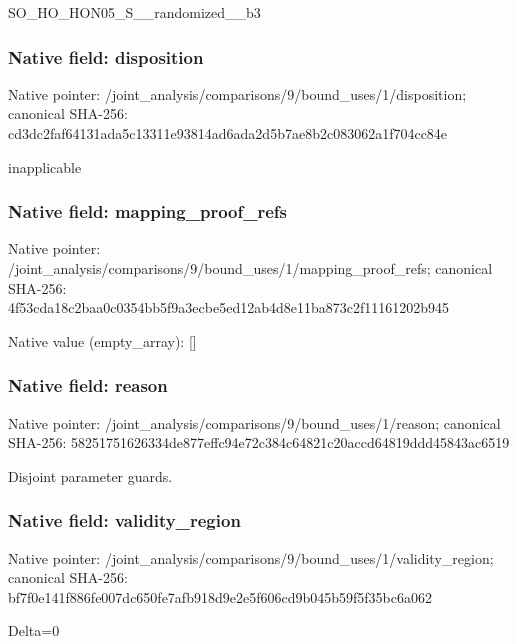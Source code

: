 \documentclass[10pt,a4paper]{article}
\begin{document}
\begingroup\raggedright\sloppy SO\_\allowbreak{}HO\_\allowbreak{}HON05\_\allowbreak{}S\_\allowbreak{}\_\allowbreak{}randomized\_\allowbreak{}\_\allowbreak{}b3\par\endgroup

\subsubsection{Native field: disposition}
Native pointer: /joint\_\allowbreak{}analysis/comparisons/9/bound\_\allowbreak{}uses/1/disposition; canonical SHA-256: cd3dc2faf64131ada5c13311e93814ad6ada2d5b7ae8b2c083062a1f704cc84e

\begingroup\raggedright\sloppy inapplicable\par\endgroup

\subsubsection{Native field: mapping\_\allowbreak{}proof\_\allowbreak{}refs}
Native pointer: /joint\_\allowbreak{}analysis/comparisons/9/bound\_\allowbreak{}uses/1/mapping\_\allowbreak{}proof\_\allowbreak{}refs; canonical SHA-256: 4f53cda18c2baa0c0354bb5f9a3ecbe5ed12ab4d8e11ba873c2f11161202b945

Native value (empty\_\allowbreak{}array): []

\subsubsection{Native field: reason}
Native pointer: /joint\_\allowbreak{}analysis/comparisons/9/bound\_\allowbreak{}uses/1/reason; canonical SHA-256: 58251751626334de877effc94e72c384c64821c20accd64819ddd45843ac6519

\begingroup\raggedright\sloppy Disjoint parameter guards.\par\endgroup

\subsubsection{Native field: validity\_\allowbreak{}region}
Native pointer: /joint\_\allowbreak{}analysis/comparisons/9/bound\_\allowbreak{}uses/1/validity\_\allowbreak{}region; canonical SHA-256: bf7f0e141f886fe007dc650fe7afb918d9e2e5f606cd9b045b59f5f35bc6a062

\begingroup\raggedright\sloppy Delta=\allowbreak{}0\par\endgroup
\end{document}
